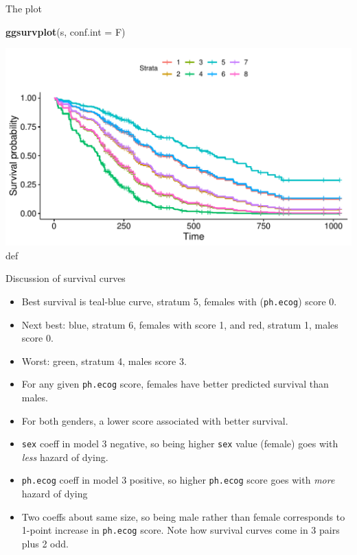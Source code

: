 \documentclass[ignorenonframetext,]{beamer}
\newenvironment{Shaded}{\begin{snugshade}}{\end{snugshade}}
\newcommand{\DataTypeTok}[1]{\textcolor[rgb]{0.13,0.29,0.53}{#1}}
\newcommand{\KeywordTok}[1]{\textcolor[rgb]{0.13,0.29,0.53}{\textbf{#1}}}
\newcommand{\NormalTok}[1]{#1}
\begin{document}
\begin{frame}[fragile]{The plot}
\protect\hypertarget{the-plot-4}{}

\begin{Shaded}
\begin{Highlighting}[]
\KeywordTok{ggsurvplot}\NormalTok{(s, }\DataTypeTok{conf.int =}\NormalTok{ F)}
\end{Highlighting}
\end{Shaded}

\includegraphics{figure/unnamed-chunk-149-1.pdf} def

\end{frame}

\begin{frame}[fragile]{Discussion of survival curves}
\protect\hypertarget{discussion-of-survival-curves}{}

\begin{itemize}
\item
  Best survival is teal-blue curve, stratum 5, females with
  (\texttt{ph.ecog}) score 0.
\item
  Next best: blue, stratum 6, females with score 1, and red, stratum 1,
  males score 0.
\item
  Worst: green, stratum 4, males score 3.
\item
  For any given \texttt{ph.ecog} score, females have better predicted
  survival than males.
\item
  For both genders, a lower score associated with better survival.
\item
  \texttt{sex} coeff in model 3 negative, so being higher \texttt{sex}
  value (female) goes with \emph{less} hazard of dying.
\item
  \texttt{ph.ecog} coeff in model 3 positive, so higher \texttt{ph.ecog}
  score goes with \emph{more} hazard of dying
\item
  Two coeffs about same size, so being male rather than female
  corresponds to 1-point increase in \texttt{ph.ecog} score. Note how
  survival curves come in 3 pairs plus 2 odd.
\end{itemize}

\end{frame}
\end{document}
